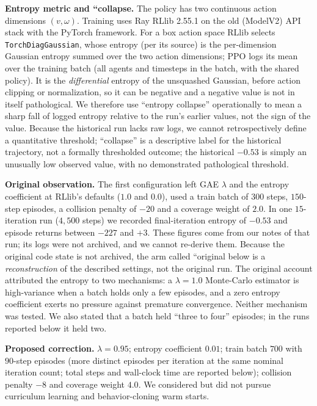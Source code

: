 \documentclass[12pt]{article}
\begin{document}
\textbf{Entropy metric and ``collapse.} The policy has two continuous action dimensions $(v,\omega)$. Training uses Ray RLlib 2.55.1 on the old (ModelV2) API stack with the PyTorch framework. For a box action space RLlib selects \texttt{TorchDiagGaussian}, whose entropy (per its source) is the per-dimension Gaussian entropy summed over the two action dimensions; PPO logs its mean over the training batch (all agents and timesteps in the batch, with the shared policy). It is the \emph{differential} entropy of the unsquashed Gaussian, before action clipping or normalization, so it can be negative and a negative value is not in itself pathological. We therefore use ``entropy collapse'' operationally to mean a sharp fall of logged entropy relative to the run's earlier values, not the sign of the value. Because the historical run lacks raw logs, we cannot retrospectively define a quantitative threshold; ``collapse'' is a descriptive label for the historical trajectory, not a formally thresholded outcome; the historical $-0.53$ is simply an unusually low observed value, with no demonstrated pathological threshold.

\textbf{Original observation.} The first configuration left GAE $\lambda$
and the entropy coefficient at RLlib's defaults ($1.0$ and $0.0$), used a
train batch of $300$ steps, $150$-step episodes, a collision penalty of
$-20$ and a coverage weight of $2.0$. In one $15$-iteration run ($4{,}500$
steps) we recorded final-iteration entropy of $-0.53$ and episode returns
between $-227$ and $+3$. These figures come from our notes of that run; its
logs were not archived, and we cannot re-derive them. Because the original code state is not archived, the arm called ``original below is a \emph{reconstruction} of the described settings, not the original run. The original account
attributed the entropy to two mechanisms: a $\lambda=1.0$ Monte-Carlo
estimator is high-variance when a batch holds only a few episodes, and a zero
entropy coefficient exerts no pressure against premature convergence.
Neither mechanism was tested. We also stated that a batch held ``three to
four'' episodes; in the runs reported below it held two.

\textbf{Proposed correction.} $\lambda=0.95$; entropy coefficient $0.01$;
train batch $700$ with $90$-step episodes (more distinct episodes per iteration at the same nominal iteration count; total steps and wall-clock time are reported below); collision penalty $-8$ and coverage weight $4.0$. We considered but
did not pursue curriculum learning and behavior-cloning warm starts.
\end{document}
